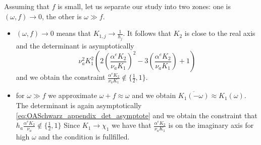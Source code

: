 Assuming that $f$ is small, let us separate our study into two zones:
one is $(\omega, f) \rightarrow 0$, the other is $\omega \gg f$.
\begin{itemize}
 \item $(\omega, f) \rightarrow 0$
	means that $K_{1,j} \rightarrow \frac{1}{h_j}$.
	It follows that $K_2$ is close to the real axis and the determinant
	is asymptotically
	\begin{equation}
		\label{eq:OASchwarz_appendix_det_asymptote}
	\nu_a^2 K_1^2 \left(2 \left(\frac{\alpha^e K_2}{\nu_a K_1}\right)^2
		- 3 \left(\frac{\alpha^e K_2}{\nu_a K_1}\right) + 1 \right)
	\end{equation}
	and we obtain the constraint
	$\frac{\alpha^e K_2}{\nu_a K_1}
	\notin \{\frac{1}{2},1\}$.
 \item for $\omega \gg f$ we approximate $\omega+f \approx \omega$
	 and we obtain $\overline{K_1(-\omega)} \approx K_1(\omega)$.
	 The determinant is again asymptotically
	\eqref{eq:OASchwarz_appendix_det_asymptote}
	and we obtain the constraint that
	$h_a\frac{\alpha^e K_2}{\nu_a} \notin \{\frac{1}{2},1\}$
	Since $K_1 \rightarrow \chi_1$ we have that
	$\frac{\alpha^e K_2}{\nu_a K_1}$ is on the imaginary axis for
	high $\omega$ and the condition is fullfilled.
\end{itemize}
